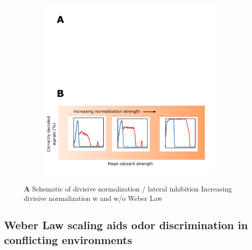 \begin{figure}
	\begin{subfigure}[t]{\linewidth}
		\includegraphics[width=\textwidth]{figures/Figures_signal_decoding_weber_law_2}
		\label{fig:divisive_normalization_a}
	\end{subfigure}
	\begin{subfigure}[t]{\linewidth}
		\label{fig:divisive_normalization_b}
	\end{subfigure}
	\caption{\textbf{A} Schematic of divisive normalization / lateral inhibition  Increasing divisive normalization w and w/o Weber Law}
	\label{fig:divisive_normalization}
\end{figure}






\subsection{Weber Law scaling aids odor discrimination in conflicting environments}


